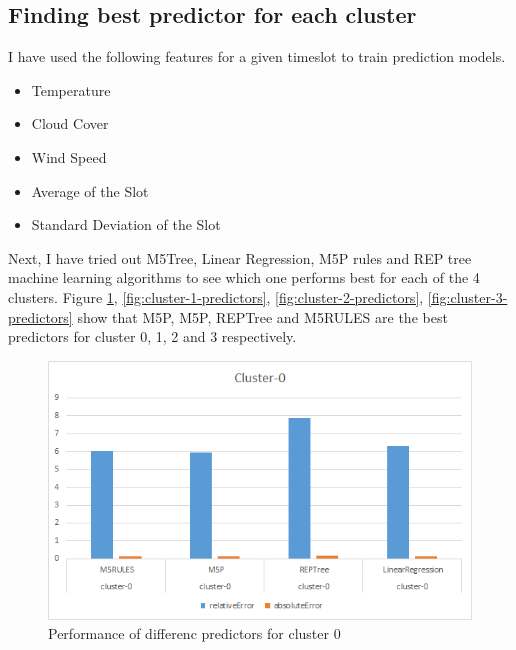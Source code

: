 \subsection {Finding best predictor for each cluster}
I have used the following features for a given timeslot to train prediction models. 
 
\begin{itemize}
  \item Temperature
  \item Cloud Cover
  \item Wind Speed
  \item Average of the Slot
  \item Standard Deviation of the Slot
\end{itemize}

Next, I have tried out  M5Tree, Linear Regression, M5P rules and REP tree machine learning algorithms to see which one performs best for each of the 4 clusters. Figure \ref{fig:cluster-0-predictors}, \ref{fig:cluster-1-predictors}, \ref{fig:cluster-2-predictors}, \ref{fig:cluster-3-predictors} show that M5P, M5P, REPTree and M5RULES are the best predictors for cluster 0, 1, 2 and 3 respectively.


\begin{figure}[h!]
  \includegraphics[width=\linewidth]{cluster-0-predictors.png}
  \caption{Performance of differenc predictors for cluster 0}
  \label{fig:cluster-0-predictors}
\end{figure}

